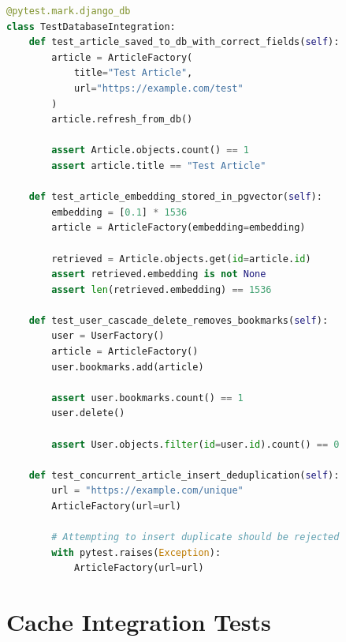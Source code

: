 \documentclass{report}
\begin{document}
\begin{lstlisting}[language=Python, caption=Database integration tests]
@pytest.mark.django_db
class TestDatabaseIntegration:
    def test_article_saved_to_db_with_correct_fields(self):
        article = ArticleFactory(
            title="Test Article",
            url="https://example.com/test"
        )
        article.refresh_from_db()
        
        assert Article.objects.count() == 1
        assert article.title == "Test Article"

    def test_article_embedding_stored_in_pgvector(self):
        embedding = [0.1] * 1536
        article = ArticleFactory(embedding=embedding)
        
        retrieved = Article.objects.get(id=article.id)
        assert retrieved.embedding is not None
        assert len(retrieved.embedding) == 1536

    def test_user_cascade_delete_removes_bookmarks(self):
        user = UserFactory()
        article = ArticleFactory()
        user.bookmarks.add(article)
        
        assert user.bookmarks.count() == 1
        user.delete()
        
        assert User.objects.filter(id=user.id).count() == 0

    def test_concurrent_article_insert_deduplication(self):
        url = "https://example.com/unique"
        ArticleFactory(url=url)
        
        # Attempting to insert duplicate should be rejected
        with pytest.raises(Exception):
            ArticleFactory(url=url)
\end{lstlisting}

\section{Cache Integration Tests}
\end{document}
